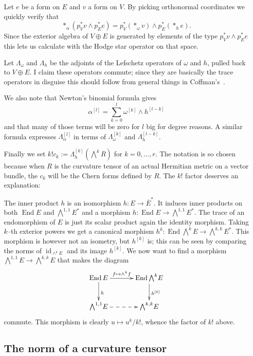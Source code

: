 \documentclass[11pt,a4paper]{amsart}
\def\^#1{^{[#1]}}
\def\ap#1{\alpha^{[#1]}}
\def\wp#1{\omega^{[#1]}}
\def\hp#1{h^{[#1]}}
\def\Lp#1{\Lambda^{[#1]}}
\DeclareMathOperator{\id}{id}
\DeclareMathOperator{\End}{End}
\theoremstyle{definition}
\numberwithin{equation}{section}
\begin{document}
Let $e$ be a form on $E$ and $v$ a form on $V$. By picking orthonormal
coordinates we quickly verify that
$$
*_\alpha(p_V^* v \wedge p_E^* e) 
= p_V^*(*_\omega v) \wedge p_E^*(*_h e).
$$
Since the exterior algebra of $V \oplus E$ is generated by elements of the
type $p_V^* v \wedge p_E^* e$ this lets us calculate with the Hodge star
operator on that space.

Let $\Lambda_\omega$ and $\Lambda_h$ be the adjoints of the Lefschetz
operators of $\omega$ and $h$, pulled back to $V \oplus E$. I claim these
operators commute; since they are basically the trace operators in disguise
this should follow from general things in Coffman's~\cite{Coffman}. 

We also note that Newton's binomial formula gives
$$
\ap{l} = \sum_{k=0}^{l} \wp{k} \wedge \hp{l-k}
$$
and that many of those terms will be zero for $l$ big for degree
reasons. A similar formula expresses $\Lp{l}_\alpha$ in terms of
$\Lp{k}_\omega$ and $\Lp{l-k}_h$.

Finally we set $k! c_k := \Lp{k}_h (\bigwedge^k \! R)$ for $k = 0, \ldots,
r$.  The notation is so chosen because when $R$ is the curvature tensor of
an actual Hermitian metric on a vector bundle, the $c_k$ will be the Chern
forms defined by $R$. The $k!$ factor deserves an explanation:

The inner product $h$ is an isomorphism $h : E \to \overline E^*$. It
induces inner products on both $\End E$ and $\bigwedge^{1,1} \! E^*$ and a
morphism $h : \End E \to \bigwedge^{1,1} \! E^*$. The trace of an
endomorphism of $E$ is just its scalar product again the identity morphism.
Taking $k$--th exterior powers we get a canonical morphism $h^k : \End
\bigwedge^k \! E \to \bigwedge^{k,k} \! E^*$. This morphism is however not
an isometry, but $h\^k$ is; this can be seen by comparing the norms of
$\id_{\wedge^k E}$ and its image $h\^k$. We now want to find a morphism
$\bigwedge^{1,1} \! E \to \bigwedge^{k,k} \! E$ that makes the diagram
$$
\xymatrix@C+10pt{
    \End E \ar[r]^-{f \mapsto \wedge^k f} \ar[d]^{h} & 
    \End \bigwedge^{k} \! E \ar[d]^{h\^k} \\
    \bigwedge^{1,1} \! E \ar@{-->}[r] 
    & \bigwedge^{k,k} \! E
}
$$
commute. This morphism is clearly $u \mapsto u^k / k!$, whence the factor
of $k!$ above.



\subsection*{The norm of a curvature tensor}
\end{document}
